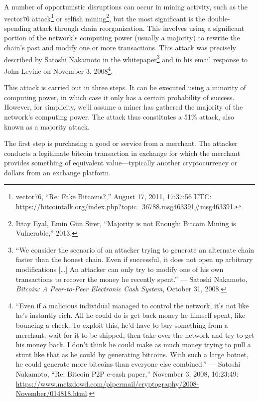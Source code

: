 \documentclass[
  a5paper,
  smalldemyvopaper,10pt,twoside,onecolumn,openright,extrafontsizes,hidelinks]{memoir}
\begin{document}
A number of opportunistic disruptions can occur in mining activity, such
as the vector76 attack\footnote{vector76, ``Re: Fake Bitcoins?,'' August
  17, 2011, 17:37:56 UTC:
  \url{https://bitcointalk.org/index.php?topic=36788.msg463391\#msg463391}.}
or selfish mining\footnote{Ittay Eyal, Emin Gün Sirer, ``Majority is not
  Enough: Bitcoin Mining is Vulnerable,'' 2013.}, but the most
significant is the double-spending attack through chain reorganization.
This involves using a significant portion of the network's computing
power (usually a majority) to rewrite the chain's past and modify one or
more transactions. This attack was precisely described by Satoshi
Nakamoto in the whitepaper\footnote{``We consider the scenario of an
  attacker trying to generate an alternate chain faster than the honest
  chain. Even if successful, it does not open up arbitrary modifications
  {[}\ldots{]} An attacker can only try to modify one of his own
  transactions to recover the money he recently spent.'' --- Satoshi
  Nakamoto, \emph{Bitcoin: A Peer-to-Peer Electronic Cash System},
  October 31, 2008.} and in his email response to John Levine on
November 3, 2008\footnote{``Even if a malicious individual managed to
  control the network, it's not like he's instantly rich. All he could
  do is get back money he himself spent, like bouncing a check. To
  exploit this, he'd have to buy something from a merchant, wait for it
  to be shipped, then take over the network and try to get his money
  back. I don't think he could make as much money trying to pull a stunt
  like that as he could by generating bitcoins. With such a large
  botnet, he could generate more bitcoins than everyone else combined.''
  --- Satoshi Nakamoto, ``Re: Bitcoin P2P e-cash paper,'' November 3,
  2008, 16:23:49:
  \url{https://www.metzdowd.com/pipermail/cryptography/2008-November/014818.html}.}.

This attack is carried out in three steps. It can be executed using a
minority of computing power, in which case it only has a certain
probability of success. However, for simplicity, we'll assume a miner
has gathered the majority of the network's computing power. The attack
thus constitutes a 51\% attack, also known as a majority attack.

The first step is purchasing a good or service from a merchant. The
attacker conducts a legitimate bitcoin transaction in exchange for which
the merchant provides something of equivalent value---typically another
cryptocurrency or dollars from an exchange platform.
\end{document}
